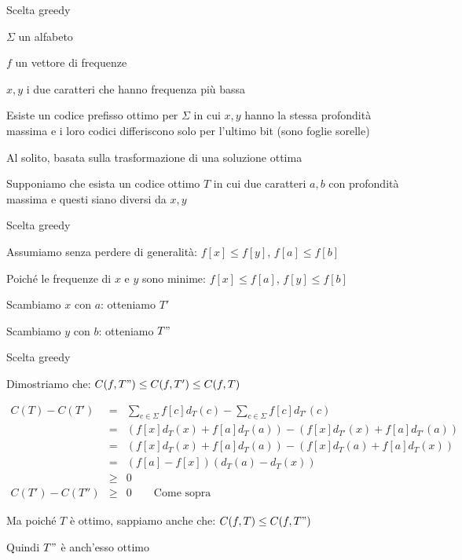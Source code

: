 \begin{frame}{Scelta greedy}

\BI
\item $\Sigma$ un alfabeto
\item $f$ un vettore di frequenze
\item $x, y$ i due caratteri che hanno frequenza più bassa
\EI

\BI
\item Esiste un codice prefisso ottimo per $\Sigma$ in cui $x,y$ hanno la stessa 
profondità massima e i loro codici differiscono solo per l'ultimo bit (sono foglie sorelle)
\EI

\BI
\item Al solito, basata sulla trasformazione di una soluzione ottima
\item Supponiamo che esista un codice ottimo $T$ in cui due caratteri $a,b$ con profondità massima e questi siano diversi da $x,y$
\EI
\end{frame}

\begin{frame}{Scelta greedy}

\vspace{-6pt}
\BIL
\item Assumiamo senza perdere di generalità: $f[x] \leq f[y]$,		$f[a] \leq f[b]$
\item Poiché le frequenze di $x$ e $y$ sono minime:    $f[x] \leq f[a]$,		$f[y] \leq f[b]$
\item Scambiamo $x$ con $a$: otteniamo $T'$
\item Scambiamo $y$ con $b$: otteniamo $T"$
\EIL


\end{frame}

\begin{frame}[shrink=5]{Scelta greedy}

\BIL
\item Dimostriamo che: $C(f,T") \leq C(f, T') \leq C(f,T)$

\begin{eqnarray*}
C(T) - C(T') &=& \sum_{c \in \Sigma} f[c]d_T(c) - \sum_{c \in \Sigma} f[c]d_{T'}(c) \\
             &=& (f[x]d_T(x)+f[a]d_T(a)) - (f[x]d_{T'}(x)+f[a]d_{T'}(a)) \\
             &=& (f[x]d_T(x)+f[a]d_T(a)) - (f[x]d_{T}(a)+f[a]d_{T}(x)) \\
             &=& (f[a]-f[x])(d_T(a)-d_T(x)) \\
             &\geq& 0 \\
C(T') - C(T'') &\geq& 0 \qquad \textrm{Come sopra}
\end{eqnarray*}

\item Ma poiché $T$ è ottimo, sappiamo anche che: $C(f,T) \leq C(f,T")$
\item Quindi $T"$ è anch'esso ottimo
\EIL

\end{frame}


